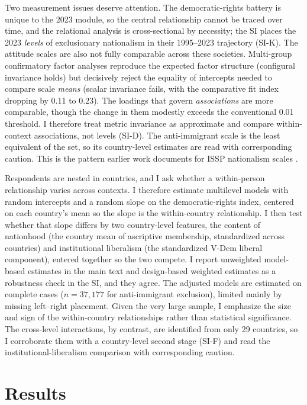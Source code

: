 Two measurement issues deserve attention. The democratic-rights battery is unique to the 2023 module, so the central relationship cannot be traced over time, and the relational analysis is cross-sectional by necessity; the SI places the 2023 \emph{levels} of exclusionary nationalism in their 1995--2023 trajectory (SI-K). The attitude scales are also not fully comparable across these societies. Multi-group confirmatory factor analyses reproduce the expected factor structure (configural invariance holds) but decisively reject the equality of intercepts needed to compare scale \emph{means} (scalar invariance fails, with the comparative fit index dropping by 0.11 to 0.23). The loadings that govern \emph{associations} are more comparable, though the change in them modestly exceeds the conventional 0.01 threshold. I therefore treat metric invariance as approximate and compare within-context associations, not levels (SI-D). The anti-immigrant scale is the least equivalent of the set, so its country-level estimates are read with corresponding caution. This is the pattern earlier work documents for ISSP nationalism scales \citep{reeskens2010}.

Respondents are nested in countries, and I ask whether a within-person relationship varies across contexts. I therefore estimate multilevel models with random intercepts and a random slope on the democratic-rights index, centered on each country's mean so the slope is the within-country relationship. I then test whether that slope differs by two country-level features, the content of nationhood (the country mean of ascriptive membership, standardized across countries) and institutional liberalism (the standardized V-Dem liberal component), entered together so the two compete. I report unweighted model-based estimates in the main text and design-based weighted estimates as a robustness check in the SI, and they agree. The adjusted models are estimated on complete cases ($n = 37{,}177$ for anti-immigrant exclusion), limited mainly by missing left--right placement. Given the very large sample, I emphasize the size and sign of the within-country relationships rather than statistical significance. The cross-level interactions, by contrast, are identified from only 29 countries, so I corroborate them with a country-level second stage (SI-F) and read the institutional-liberalism comparison with corresponding caution.

\section{Results}\label{results}

